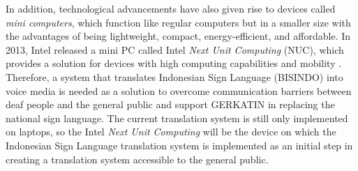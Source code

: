 In addition, technological advancements have also given rise to devices called \emph{mini computers}, which function like regular computers but in a smaller size with the advantages of being lightweight, compact, energy-efficient, and affordable. In 2013, Intel released a mini PC called Intel \emph{Next Unit Computing} (NUC), which provides a solution for devices with high computing capabilities and mobility \cite{minny2023}. Therefore, a system that translates Indonesian Sign Language (BISINDO) into voice media is needed as a solution to overcome communication barriers between deaf people and the general public and support GERKATIN in replacing the national sign language. The current translation system is still only implemented on laptops, so the Intel \emph{Next Unit Computing} will be the device on which the Indonesian Sign Language translation system is implemented as an initial step in creating a translation system accessible to the general public.
